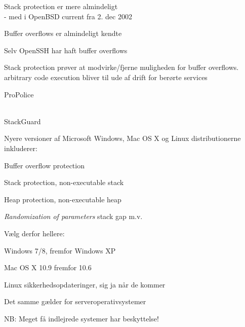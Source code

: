 \documentclass[20pt,landscape,a4paper,footrule]{foils}
\begin{document}
\begin{list1}
\item Stack protection er mere almindeligt\\
- med i OpenBSD current fra 2. dec 2002

\item Buffer overflows er almindeligt kendte
\begin{list2}
\item Selv OpenSSH har haft buffer overflows
\item Stack protection prøver at modvirke/fjerne
  muligheden for buffer overflows. arbitrary code execution
  bliver til ude af drift for berørte services
\end{list2}

\item ProPolice\\
\\

\item StackGuard\\
\end{list1}


\begin{list1}
\item Nyere versioner af Microsoft Windows, Mac OS X og Linux distributionerne inkluderer:
\begin{list2}
\item Buffer overflow protection
\item Stack protection, non-executable stack
\item Heap protection, non-executable heap
\item \emph{Randomization of parameters} stack gap m.v.
\end{list2}
\item Vælg derfor hellere:
\begin{list2}
\item Windows 7/8, fremfor Windows XP
\item Mac OS X 10.9 fremfor 10.6
\item Linux sikkerhedsopdateringer, sig ja når de kommer
\end{list2}
\item Det samme gælder for serveroperativsystemer
\item NB: Meget få indlejrede systemer har beskyttelse!
\end{list1}
\end{document}
